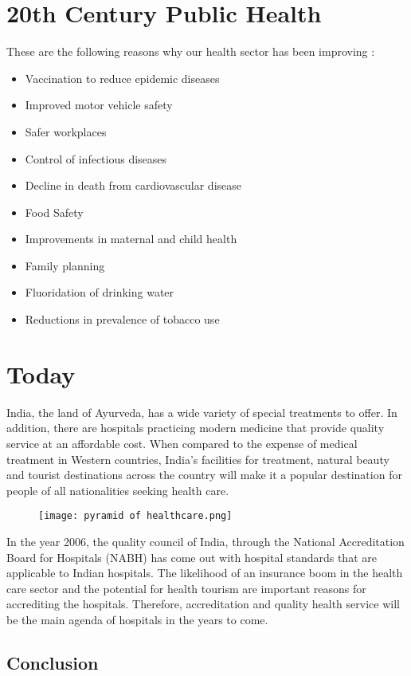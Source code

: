 \documentclass[11pt]{article}
\begin{document}
\section{\huge 20th Century Public Health}
These are the following reasons why our health sector has been improving :
\begin{itemize}
\item \large Vaccination to reduce epidemic diseases
\item \large Improved motor vehicle safety
\item \large Safer workplaces
\item \large Control of infectious diseases
\item \large Decline in death from cardiovascular disease
\item \large Food Safety
\item \large Improvements in maternal and child health 
\item \large Family planning
\item \large Fluoridation of drinking water
\item \large  Reductions in prevalence of tobacco use
\end{itemize}
\clearpage
\section{Today}
\Large India, the land of Ayurveda, has a wide variety of special treatments to offer. In addition, there are hospitals practicing modern medicine that provide quality service at an affordable cost. When compared to the expense of medical treatment in Western countries, India’s facilities for treatment, natural beauty and tourist destinations across the country will make it a popular destination for people of all nationalities seeking health care.
\begin{figure}[h]
\texttt{[image: pyramid of healthcare.png]}
\end{figure}


In the year 2006, the quality council of India, through the National Accreditation Board for Hospitals (NABH) has come out with hospital standards that are applicable to Indian hospitals. The likelihood of an insurance boom in the health care sector and the potential for health tourism are important reasons for accrediting the hospitals. Therefore, accreditation and quality health service will be the main agenda of hospitals in the years to come.

\subsection{Conclusion}
\end{document}
